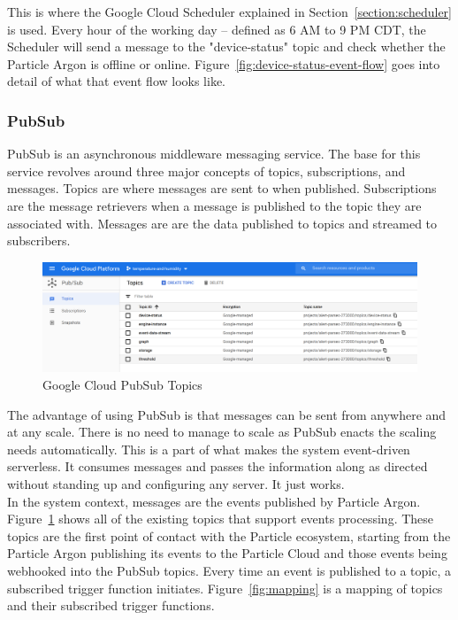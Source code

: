 \documentclass{article}
\begin{document}
This is where the Google Cloud Scheduler explained in Section~\ref{section:scheduler} is used. Every hour of the working day -- defined as 6 AM to 9 PM CDT, the Scheduler will send a message to the "device-status" topic and check whether the Particle Argon is offline or online. Figure~\ref{fig:device-status-event-flow} goes into detail of what that event flow looks like.

\subsubsection{PubSub}
\label{section:pubsub}
PubSub is an asynchronous middleware messaging service. The base for this service revolves around three major concepts of topics, subscriptions, and messages. Topics are where messages are sent to when published. Subscriptions are the message retrievers when a message is published to the topic they are associated with. Messages are are the data published to topics and streamed to subscribers.

\begin{figure}[H]
    \center
    \includegraphics[width=\textwidth]{images/pubsub-topics.png}
    \caption{Google Cloud PubSub Topics}
    \label{fig:pubsub-topics}
\end{figure}

The advantage of using PubSub is that messages can be sent from anywhere and at any scale. There is no need to manage to scale as PubSub enacts the scaling needs automatically. This is a part of what makes the system event-driven serverless. It consumes messages and passes the information along as directed without standing up and configuring any server. It just works.\\

In the system context, messages are the events published by Particle Argon. Figure~\ref{fig:pubsub-topics} shows all of the existing topics that support events processing. These topics are the first point of contact with the Particle ecosystem, starting from the Particle Argon publishing its events to the Particle Cloud and those events being webhooked into the PubSub topics. Every time an event is published to a topic, a subscribed trigger function initiates. Figure~\ref{fig:mapping} is a mapping of topics and their subscribed trigger functions.\\
\end{document}
